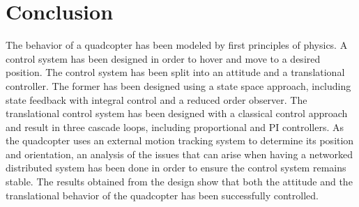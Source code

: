 \section{Conclusion}
The behavior of a quadcopter has been modeled by first principles of physics. A control system has been designed in order to hover and move to a desired position.
The control system has been split into an attitude and a translational controller. The former has been designed using a state space approach, including state feedback with integral control and a reduced order observer. The translational control system has been designed with a classical control approach and result in three cascade loops, including proportional and PI controllers. 
As the quadcopter uses an external motion tracking system to determine its position and orientation, an analysis of the issues that can arise when having a networked distributed system has been done in order to ensure the control system remains stable. The results obtained from the design show that both the attitude and the translational behavior of the quadcopter has been successfully controlled.

